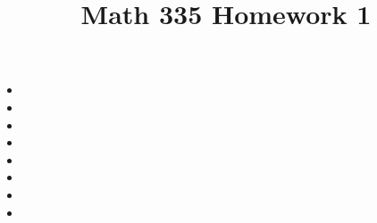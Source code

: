 \documentclass{article}
\title{Math 335 Homework 1}
\begin{document}
\maketitle
\begin{itemize}[label=]
	\item 
	\item 
	\item 
	\item 
	\item 
	\item 
	\item 
	\item 
\end{itemize}
\end{document}

